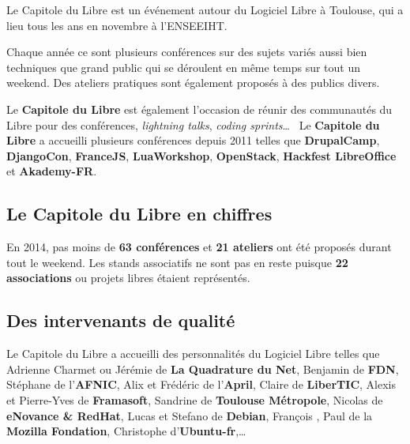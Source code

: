 
Le Capitole du Libre est un événement autour du Logiciel Libre à Toulouse, qui a lieu tous les ans en novembre à l'ENSEEIHT.

Chaque année ce sont plusieurs conférences sur des sujets variés aussi bien techniques que grand public qui se déroulent en même temps sur tout un weekend. Des ateliers pratiques sont également proposés à des publics divers.

\Separateur

Le \textbf{Capitole du Libre} est également l'occasion de réunir des communautés du Libre pour des conférences, \textit{lightning talks}, \textit{coding sprints}\dots ~ Le \textbf{Capitole du Libre} a accueilli plusieurs conférences depuis 2011 telles que \textbf{DrupalCamp}, \textbf{DjangoCon},  \textbf{FranceJS}, \textbf{LuaWorkshop}, \textbf{OpenStack}, \textbf{Hackfest LibreOffice} et \textbf{Akademy-FR}.

\subsection{Le Capitole du Libre en chiffres}

En 2014, pas moins de \textbf{63 conférences} et \textbf{21 ateliers} ont été proposés durant tout le weekend. Les stands associatifs ne sont pas en reste puisque \textbf{22 associations} ou projets libres étaient représentés.

\subsection{Des intervenants de qualité}

Le Capitole du Libre a accueilli des personnalités du Logiciel Libre telles que Adrienne Charmet ou Jérémie  de \textbf{La Quadrature du Net}, Benjamin  de \textbf{FDN}, Stéphane  de l'\textbf{AFNIC}, Alix  et Frédéric  de l'\textbf{April}, Claire  de \textbf{LiberTIC}, Alexis  et Pierre-Yves  de \textbf{Framasoft}, Sandrine  de \textbf{Toulouse Métropole}, Nicolas  de \textbf{eNovance \& RedHat}, Lucas  et Stefano  de \textbf{Debian}, François , Paul  de la \textbf{Mozilla Fondation}, Christophe  d'\textbf{Ubuntu-fr},\dots
